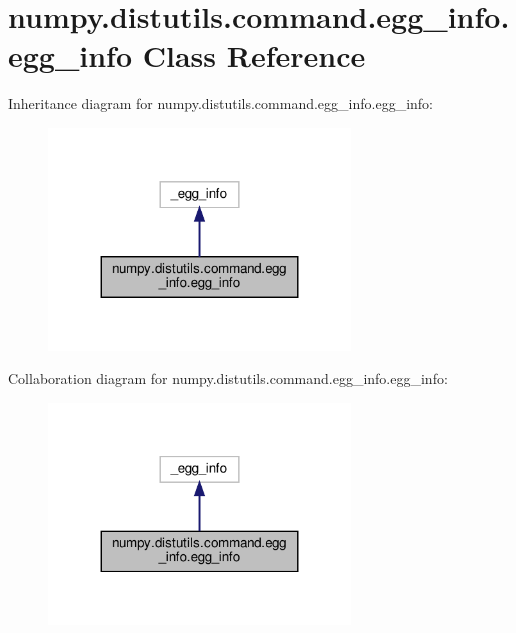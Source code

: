 \hypertarget{classnumpy_1_1distutils_1_1command_1_1egg__info_1_1egg__info}{}\section{numpy.\+distutils.\+command.\+egg\+\_\+info.\+egg\+\_\+info Class Reference}
\label{classnumpy_1_1distutils_1_1command_1_1egg__info_1_1egg__info}


Inheritance diagram for numpy.\+distutils.\+command.\+egg\+\_\+info.\+egg\+\_\+info\+:
\nopagebreak
\begin{figure}[H]
\begin{center}
\leavevmode
\includegraphics[width=227pt]{classnumpy_1_1distutils_1_1command_1_1egg__info_1_1egg__info__inherit__graph}
\end{center}
\end{figure}


Collaboration diagram for numpy.\+distutils.\+command.\+egg\+\_\+info.\+egg\+\_\+info\+:
\nopagebreak
\begin{figure}[H]
\begin{center}
\leavevmode
\includegraphics[width=227pt]{classnumpy_1_1distutils_1_1command_1_1egg__info_1_1egg__info__coll__graph}
\end{center}
\end{figure}
